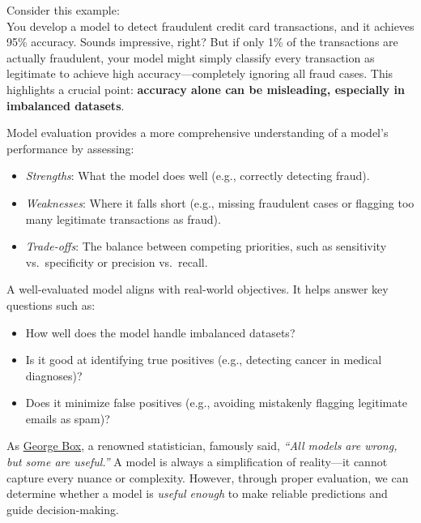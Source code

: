 \documentclass[
]{book}
\providecommand{\tightlist}{%
  \setlength{\itemsep}{0pt}\setlength{\parskip}{0pt}}
\theoremstyle{definition}
\theoremstyle{definition}
\theoremstyle{definition}
\theoremstyle{definition}
\theoremstyle{remark}
\begin{document}
Consider this example:\\
You develop a model to detect fraudulent credit card transactions, and it achieves 95\% accuracy. Sounds impressive, right? But if only 1\% of the transactions are actually fraudulent, your model might simply classify every transaction as legitimate to achieve high accuracy---completely ignoring all fraud cases. This highlights a crucial point: \textbf{accuracy alone can be misleading, especially in imbalanced datasets}.

Model evaluation provides a more comprehensive understanding of a model's performance by assessing:

\begin{itemize}
\tightlist
\item
  \emph{Strengths}: What the model does well (e.g., correctly detecting fraud).\\
\item
  \emph{Weaknesses}: Where it falls short (e.g., missing fraudulent cases or flagging too many legitimate transactions as fraud).\\
\item
  \emph{Trade-offs}: The balance between competing priorities, such as sensitivity vs.~specificity or precision vs.~recall.
\end{itemize}

A well-evaluated model aligns with real-world objectives. It helps answer key questions such as:

\begin{itemize}
\tightlist
\item
  How well does the model handle imbalanced datasets?\\
\item
  Is it good at identifying true positives (e.g., detecting cancer in medical diagnoses)?\\
\item
  Does it minimize false positives (e.g., avoiding mistakenly flagging legitimate emails as spam)?
\end{itemize}

As \href{https://en.wikipedia.org/wiki/George_E._P._Box}{George Box}, a renowned statistician, famously said, \emph{``All models are wrong, but some are useful.''} A model is always a simplification of reality---it cannot capture every nuance or complexity. However, through proper evaluation, we can determine whether a model is \emph{useful enough} to make reliable predictions and guide decision-making.
\end{document}
